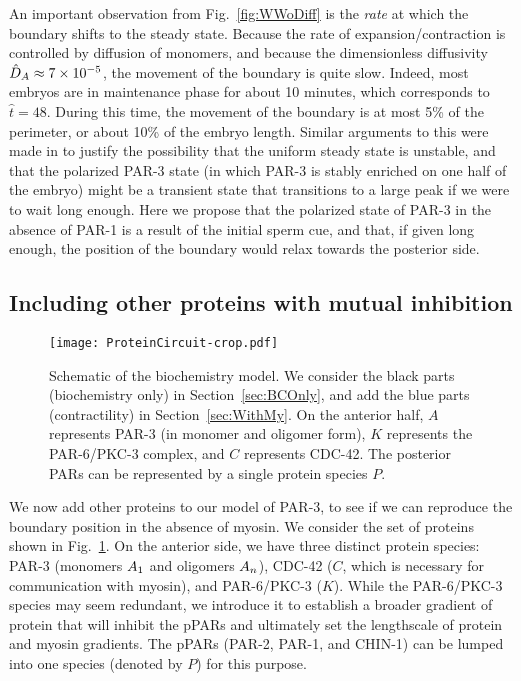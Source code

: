 \documentclass[11pt]{article}
\newcommand{\6}[1]{#1_{\text{6}}}
\newcommand{\3}[1]{#1_{\text{3}}}
\begin{document}
An important observation from Fig.\ \ref{fig:WWoDiff} is the \emph{rate} at which the boundary shifts to the steady state. Because the rate of expansion/contraction is controlled by diffusion of monomers, and because the dimensionless diffusivity $\hat{D}_A \approx 7 \times 10^{-5}$,  the movement of the boundary is quite slow. Indeed, most embryos are in maintenance phase for about 10 minutes, which corresponds to $\hat t = 48$. During this time, the movement of the boundary is at most 5\% of the perimeter, or about 10\% of the embryo length. Similar arguments to this were made in \cite{lang2022oligomerization} to justify the possibility that the uniform steady state is unstable, and that the polarized PAR-3 state (in which PAR-3 is stably enriched on one half of the embryo) \cite{lang2023oligomerization} might be a transient state that transitions to a large peak if we were to wait long enough. Here we propose that the polarized state of PAR-3 in the absence of PAR-1 is a result of the initial sperm cue, and that, if given long enough, the position of the boundary would relax towards the posterior side.

\subsection{Including other proteins with mutual inhibition \label{sec:BCOnly}}
\begin{figure}
\centering
\texttt{[image: ProteinCircuit-crop.pdf]}
\caption{\label{fig:ModelSch}Schematic of the biochemistry model. We consider the black parts (biochemistry only) in Section\ \ref{sec:BCOnly}, and add the blue parts (contractility) in Section\ \ref{sec:WithMy}. On the anterior half, $A$ represents PAR-3 (in monomer and oligomer form), $K$ represents the PAR-6/PKC-3 complex, and $C$ represents CDC-42. The posterior PARs can be represented by a single protein species $P$.}
\end{figure}

We now add other proteins to our model of PAR-3, to see if we can reproduce the boundary position in the absence of myosin. We consider the set of proteins shown in Fig.\ \ref{fig:ModelSch}. On the anterior side, we have three distinct protein species: PAR-3 (monomers $A_1$ and oligomers $A_n$), CDC-42 ($C$, which is necessary for communication with myosin), and PAR-6/PKC-3 ($K$). While the PAR-6/PKC-3 species may seem redundant, we introduce it to establish a broader gradient of protein that will inhibit the pPARs and ultimately set the lengthscale of protein and myosin gradients. The pPARs (PAR-2, PAR-1, and CHIN-1) can be lumped into one species (denoted by $P$) for this purpose.
\end{document}
